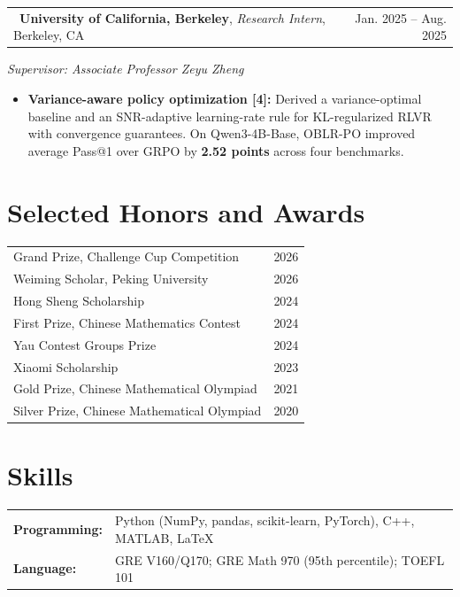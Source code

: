 \documentclass[a4paper,9pt]{extarticle}
\makeatletter
\newcommand{\datedentry}[2]{%
\begin{tabularx}{\linewidth}{@{}X r@{}}
#1 & #2
\end{tabularx}}
\makeatother
\begin{document}
\datedentry{\faCaretRight\ \textcolor{experienceblue}{\textbf{University of California, Berkeley}}, \textit{Research Intern}, Berkeley, CA}{Jan. 2025 -- Aug. 2025}
\vspace{-3pt}
\hspace{1em}\textit{Supervisor: Associate Professor Zeyu Zheng}
\begin{itemize}\setlength\itemsep{1pt}\setlength\topsep{2pt}\setlength\parsep{0pt}\setlength\parskip{0pt}\small
  \item \textbf{Variance-aware policy optimization [4]:} Derived a variance-optimal baseline and an SNR-adaptive learning-rate rule for KL-regularized RLVR with convergence guarantees. On Qwen3-4B-Base, OBLR-PO improved average Pass@1 over GRPO by \textbf{2.52 points} across four benchmarks.
\end{itemize}
\vspace{-3pt}

\section{Selected Honors and Awards}
\begin{tabularx}{\linewidth}{@{}X r@{}}
Grand Prize, Challenge Cup Competition & 2026 \\
Weiming Scholar, Peking University & 2026 \\
Hong Sheng Scholarship & 2024 \\
First Prize, Chinese Mathematics Contest & 2024 \\
Yau Contest Groups Prize & 2024 \\
Xiaomi Scholarship & 2023 \\
Gold Prize, Chinese Mathematical Olympiad & 2021 \\
Silver Prize, Chinese Mathematical Olympiad & 2020
\end{tabularx}

\section{Skills}
\begin{tabularx}{\linewidth}{@{}l X@{}}
\textbf{Programming:} & Python (NumPy, pandas, scikit-learn, PyTorch), C++, MATLAB, \LaTeX \\
\textbf{Language:} & GRE V160/Q170; GRE Math 970 (95th percentile); TOEFL 101
\end{tabularx}
\end{document}
